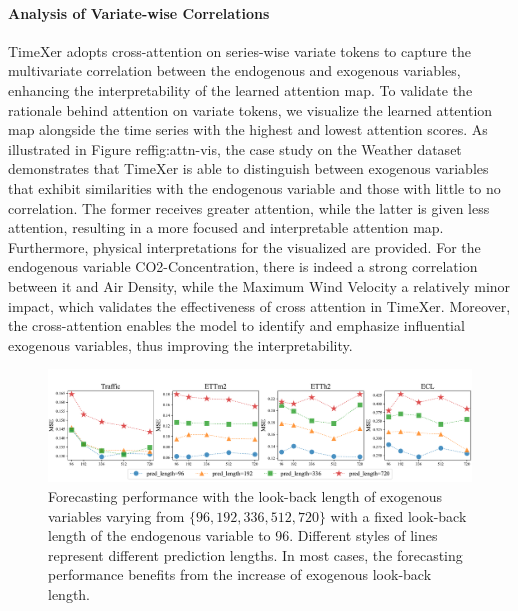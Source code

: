 \documentclass[nohyperref]{article}
\theoremstyle{plain}
\theoremstyle{definition}
\theoremstyle{remark}
\begin{document}
\paragraph{Analysis of Variate-wise Correlations}
TimeXer adopts cross-attention on series-wise variate tokens to capture the multivariate correlation between the endogenous and exogenous variables, enhancing the interpretability of the learned attention map. To validate the rationale behind attention on variate tokens, we visualize the learned attention map alongside the time series with the highest and lowest attention scores. 
As illustrated in Figure ref{fig:attn-vis}, the case study on the Weather dataset demonstrates that TimeXer is able to distinguish between exogenous variables that exhibit similarities with the endogenous variable and those with little to no correlation. The former receives greater attention, while the latter is given less attention, resulting in a more focused and interpretable attention map.
Furthermore, physical interpretations for the visualized are provided. For the endogenous variable CO2-Concentration, there is indeed a strong correlation between it and Air Density, while the Maximum Wind Velocity a relatively minor impact, which validates the effectiveness of cross attention in TimeXer. Moreover, the cross-attention enables the model to identify and emphasize influential exogenous variables, thus improving the interpretability.


\begin{figure}[t]
    \centering
    \vspace{-5pt}
    \includegraphics[width=\linewidth]{fig/Increasev2.pdf}
    \vspace{-20pt}
    \caption{Forecasting performance with the look-back length of exogenous variables varying from $\{96, 192, 336, 512, 720\}$ with a fixed look-back length of the endogenous variable to 96. Different styles of lines represent different prediction lengths. In most cases, the forecasting performance benefits from the increase of exogenous look-back length.}
    \vspace{-5pt}
    \label{fig:increase}
\end{figure}
\end{document}
